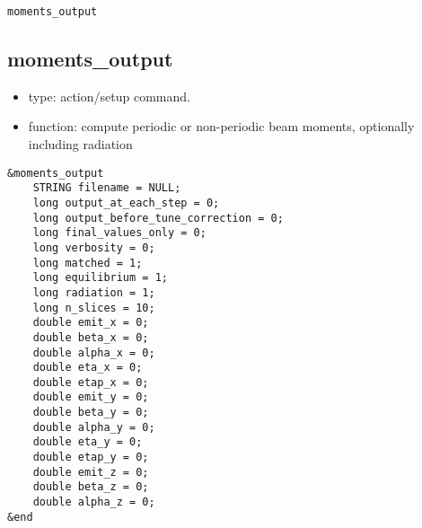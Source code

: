 \documentclass[11pt]{article}
\begin{document}
\begin{latexonly}
\newpage
\begin{center}{\Large\verb|moments_output|}\end{center}
\end{latexonly}
\subsection{moments\_output \label{subsec:momentsoutput}}

\begin{itemize}
\item type: action/setup command.
\item function: compute periodic or non-periodic beam moments, optionally including radiation
\end{itemize}

\begin{verbatim}
&moments_output
    STRING filename = NULL;
    long output_at_each_step = 0;
    long output_before_tune_correction = 0;
    long final_values_only = 0;
    long verbosity = 0;
    long matched = 1;
    long equilibrium = 1;
    long radiation = 1;
    long n_slices = 10;
    double emit_x = 0;
    double beta_x = 0;
    double alpha_x = 0;
    double eta_x = 0;
    double etap_x = 0;
    double emit_y = 0;
    double beta_y = 0;
    double alpha_y = 0;
    double eta_y = 0;
    double etap_y = 0;
    double emit_z = 0;
    double beta_z = 0;
    double alpha_z = 0;
&end
\end{verbatim}
\end{document}
